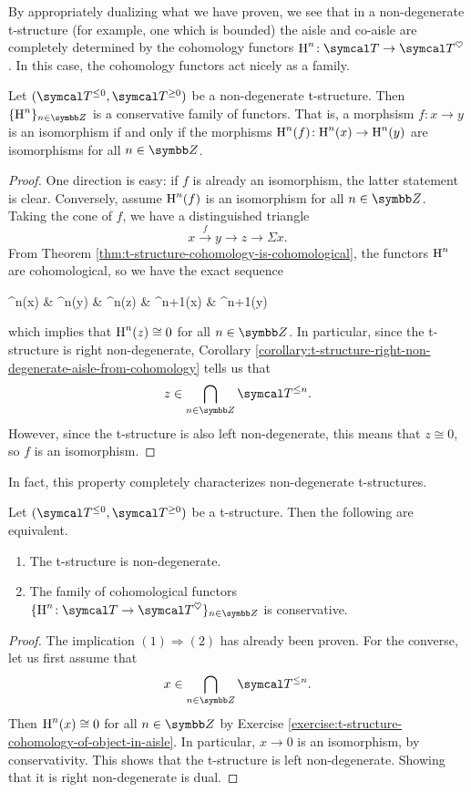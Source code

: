 By appropriately dualizing what we have proven, we see that in a non-degenerate t-structure (for example, one which is bounded) the aisle and co-aisle are completely
determined by the cohomology functors \(\HH^n\!:\calT\to\calT^\heartsuit\). In this case, the cohomology functors act nicely as a family.
\begin{proposition}
	Let \((\calT^{\leq 0},\calT^{\geq 0})\) be a non-degenerate t-structure. Then \(\{\HH^n\}_{n\in\Z}\) is a conservative family of functors. That is, a morphsism \(f\!:x\to y\)
	is an isomorphism if and only if the morphisms \(\operatorname{H}^n(f)\!:\operatorname{H}^n(x)\to\operatorname{H}^n(y)\) are isomorphisms for all \(n\in\Z\).
\end{proposition}
\begin{proof}
One direction is easy: if \(f\) is already an isomorphism, the latter statement is clear. Conversely, assume \(\operatorname{H}^n(f)\) is an isomorphism for all \(n\in\Z\). Taking the cone of \(f\),
we have a distinguished triangle
\[ x \overset{f}\to y \to z \to \Sigma x. \]
From Theorem \ref{thm:t-structure-cohomology-is-cohomological}, the functors \(\operatorname{H}^n\) are cohomological, so we have the exact sequence
\begin{diagram*}
	\HH^n(x) \ar[r,"\sim","\HH^n(f)"'] & \HH^n(y) \ar[r] & \HH^n(z) \ar[r] & \HH^{n+1}(x) \ar[r,"\sim","\HH^{n+1}(f)"'] & \HH^{n+1}(y)
\end{diagram*}
which implies that \(\operatorname{H}^n(z)\cong 0\) for all \(n\in\Z\). In particular, since the t-structure is right non-degenerate, Corollary \ref{corollary:t-structure-right-non-degenerate-aisle-from-cohomology} tells us that
\[ z \in \bigcap_{n\in\Z}\calT^{\leq n}. \]
However, since the t-structure is also left non-degenerate, this means that \(z\cong 0\), so \(f\) is an isomorphism.
\end{proof}

In fact, this property completely characterizes non-degenerate t-structures.
\begin{theorem}
	Let \((\calT^{\leq 0},\calT^{\geq 0})\) be a t-structure. Then the following are equivalent.
	\begin{enumerate}[label=(\arabic*)]
		\item The t-structure is non-degenerate.
		\item The family of cohomological functors \(\{\HH^n\!:\calT\to\calT^{\heartsuit}\}_{n\in\Z}\) is conservative.
	\end{enumerate}
\end{theorem}
\begin{proof}
The implication \((1)\Rightarrow(2)\) has already been proven. For the converse, let us first assume that
\[ x \in\bigcap_{n\in\Z}\calT^{\leq n}. \]
Then \(\operatorname{H}^n(x)\cong 0\) for all \(n\in\Z\) by Exercise \ref{exercise:t-structure-cohomology-of-object-in-aisle}. In particular, \(x \to 0\) is an isomorphism, by conservativity. This shows
that the t-structure is left non-degenerate. Showing that it is right non-degenerate is dual.
\end{proof}

